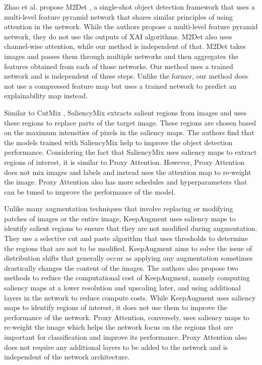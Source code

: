 Zhao et al. propose M2Det \cite{zhaoM2DetSingleShotObject2019}, a single-shot object detection framework that uses a multi-level feature pyramid network that shares similar principles of using attention in the network. While the authors propose a multi-level feature pyramid network, they do not use the outputs of XAI algorithms. M2Det also uses channel-wise attention, while our method is independent of that. M2Det takes images and passes them through multiple networks and then aggregates the features obtained from each of those networks. Our method uses a trained network and is independent of these steps. Unlike the former, our method does not use a compressed feature map but uses a trained network to predict an explainability map instead.

Similar to CutMix \cite{yunCutMixRegularizationStrategy2019}, SaliencyMix \cite{uddinSaliencyMixSaliencyGuided2021} extracts salient regions from images and uses these regions to replace parts of the target image. These regions are chosen based on the maximum intensities of pixels in the saliency maps. The authors find that the models trained with SaliencyMix help to improve the object detection performance. Considering the fact that SaliencyMix uses saliency maps to extract regions of interest, it is similar to Proxy Attention. However, Proxy Attention does not mix images and labels and instead uses the attention map to re-weight the image. Proxy Attention also has more schedules and hyperparameters that can be tuned to improve the performance of the model.

Unlike many augmentation techniques that involve replacing or modifying patches of images or the entire image, KeepAugment \cite{gongKeepAugmentSimpleInformationPreserving2021} uses saliency maps to identify salient regions to ensure that they are not modified during augmentation. They use a selective cut and paste algorithm that uses thresholds to determine the regions that are not to be modified. KeepAugment aims to solve the issue of distribution shifts that generally occur as applying any augmentation sometimes drastically changes the content of the images. The authors also propose two methods to reduce the computational cost of KeepAugment, namely computing saliency maps at a lower resolution and upscaling later, and using additional layers in the network to reduce compute costs. While KeepAugment uses saliency maps to identify regions of interest, it does not use them to improve the performance of the network. Proxy Attention, conversely, uses saliency maps to re-weight the image which helps the network focus on the regions that are important for classification and improve its performance. Proxy Attention also does not require any additional layers to be added to the network and is independent of the network architecture.

